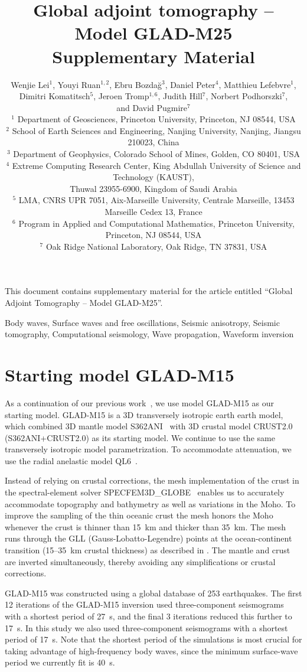 \documentclass[extra,mreferee]{gji}
\title[Global Adjoint Tomography -- Model GLAD-M25 (Supplementary Material)]
  {Global adjoint tomography -- Model GLAD-M25 \\ Supplementary Material}
\author[Lei et al.]
  {Wenjie Lei$^1$, Youyi Ruan$^{1,2}$, Ebru Bozda\u g$^3$, Daniel Peter$^4$, Matthieu Lefebvre$^1$, \\{\LARGE \rm Dimitri Komatitsch$^5$, Jeroen Tromp$^{1,6}$, Judith Hill$^7$, Norbert Podhorszki$^7$}, \\ {\LARGE \rm and David Pugmire$^7$} \\
  $^1$ Department of Geosciences, Princeton University, Princeton, NJ 08544, USA\\
  $^2$ School of Earth Sciences and Engineering, Nanjing University, Nanjing, Jiangsu 210023, China\\
  $^3$ Department of Geophysics, Colorado School of Mines, Golden, CO 80401, USA\\
  $^4$ Extreme Computing Research Center, King Abdullah University of Science and Technology (KAUST), \\Thuwal 23955-6900, Kingdom of Saudi Arabia\\
  $^5$ LMA, CNRS UPR 7051, Aix-Marseille University, Centrale Marseille, 13453 Marseille Cedex 13, France\\
  $^6$ Program in Applied and Computational Mathematics, Princeton University, Princeton, NJ 08544, USA\\
  $^7$ Oak Ridge National Laboratory, Oak Ridge, TN 37831, USA\\
  }
\begin{document}
\maketitle

%
%
\begin{summary}
This document contains supplementary material for the article entitled ``Global Adjoint Tomography -- Model GLAD-M25''.
\end{summary}

\begin{keywords}
Body waves, Surface waves and free oscillations, Seismic anisotropy, Seismic tomography, Computational seismology, Wave propagation, Waveform inversion
\end{keywords}

\section{Starting model GLAD-M15}
\label{section:start}

As a continuation of our previous work~\citep{bozdaug2016global},
we use model GLAD-M15 as our
starting model.
GLAD-M15 is a 3D transversely isotropic earth earth model, which combined
3D mantle model S362ANI~\citep{kustowski2008anisotropic}
with 3D crustal model CRUST2.0~\citep{bassin2000current} (S362ANI+CRUST2.0) as its starting model.
We continue to use the same transversely isotropic model parametrization.
To accommodate attenuation,
we use the radial anelastic model QL6~\citep{QL6}.

Instead of relying on crustal corrections,
the mesh implementation of the crust in the spectral-element solver SPECFEM3D\_GLOBE~\citep{KoTr02a,KoTr02b,PeKoLuMaLeCaLeMaLiBlNiBaTr11} enables us to accurately accommodate topography and bathymetry as well as variations in the Moho.
To improve the sampling of the thin oceanic crust the mesh honors the Moho whenever the crust is thinner than 15~km and thicker than 35~km. The mesh runs through the GLL (Gauss-Lobatto-Legendre) points at the ocean-continent transition (15--35~km crustal thickness) as described in \citet{tromp2010a}. The mantle and crust are inverted simultaneously,
thereby avoiding any simplifications or crustal corrections.

GLAD-M15 was constructed using a global database of 253 earthquakes.
The first 12 iterations of the GLAD-M15 inversion used three-component seismograms with a shortest period of 27~s,
and the final 3 iterations reduced this further to 17~s.
In this study we also used three-component seismograms with a shortest period of 17~s. Note that the shortest period of the simulations is most crucial for taking advantage of high-frequency body waves, since the minimum surface-wave period we currently fit is 40~s. 
\end{document}
